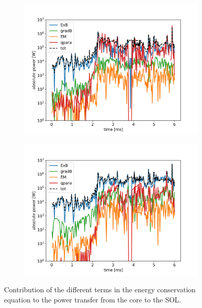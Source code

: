 \begin{figure}[H]\centering
	\begin{subfigure}[t]{0.45\textwidth}
		\centering
		\includegraphics[width=1\textwidth]{schemes/heatflux_comp_sepc_spec0.jpg}
		\label{fig:TCV_decompHeatFluxFlutter_electron}
	\end{subfigure}
	\begin{subfigure}[t]{0.45\textwidth}
		\centering
		\includegraphics[width=1\textwidth]{schemes/heatflux_comp_sepc_spec1.jpg}
		\label{fig:TCV_decompHeatFluxFlutter_ion}
	\end{subfigure}
	\caption[Contribution of the different terms in the energy conservation equation to the power transfer from the core to the SOL]{Contribution of the different terms in the energy conservation equation to the power transfer from the core to the SOL.}
	\label{fig:TCV_decompHeatFluxFlutter}
\end{figure}





